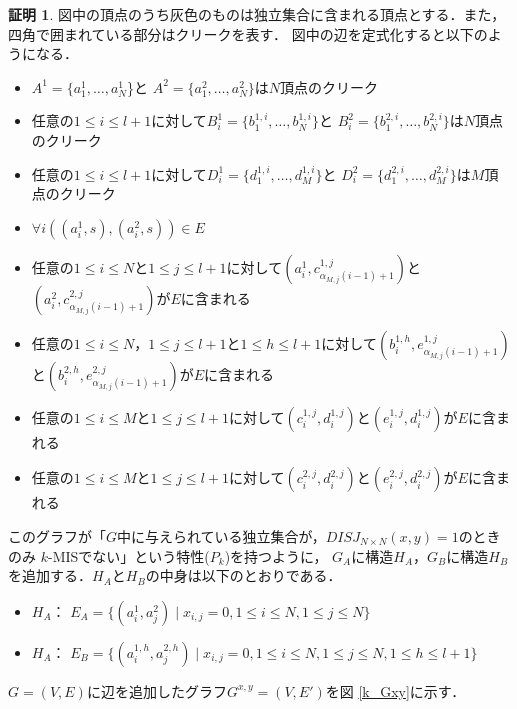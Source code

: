 \documentclass[12pt]{thesis}
\theoremstyle{definition}
\newtheorem*{prf*}{証明}
\begin{document}
\begin{prf*}
図中の頂点のうち灰色のものは独立集合に含まれる頂点とする．また，四角で囲まれている部分はクリークを表す．
図中の辺を定式化すると以下のようになる．
\begin{itemize}
\item $A^{1}=\{a^{1}_{1},\dots,a^{1}_{N}$\}と
$A^{2}=\{a^{2}_{1},\dots,a^{2}_{N}\}$は$N$頂点のクリーク
\item 任意の$1\leq i \leq l+1$に対して$B^{1}_{i}=\{b^{1,i}_{1},\dots,b^{1,i}_{N}\}$と
$B^{2}_{i}=\{b^{2,i}_{1},\dots,b^{2,i}_{N}\}$は$N$頂点のクリーク
\item 任意の$1\leq i \leq l+1$に対して$D^{1}_{i}=\{d^{1,i}_{1},\dots,d^{1,i}_{M}\}$と
$D^{2}_{i}=\{d^{2,i}_{1},\dots,d^{2,i}_{M}\}$は$M$頂点のクリーク
\item $\forall i((a_{i}^{1}, s), (a_{i}^{2}, s)) \in E$
\item 任意の$1\leq i \leq N$と$1\leq j \leq l+1$に対して$\left(a^{1}_{i},c^{1,j}_{\alpha_{M,j}(i-1)+1}\right)$と$\left(a^{2}_{i},c^{2,j}_{\alpha_{M,j}(i-1)+1}\right)$が$E$に含まれる
\item 任意の$1\leq i \leq N$，$1\leq j \leq l+1$と$1\leq h \leq l+1$に対して$\left(b^{1,h}_{i},e^{1,j}_{\alpha_{M,j}(i-1)+1}\right)$と$\left(b^{2,h}_{i},e^{2,j}_{\alpha_{M,j}(i-1)+1}\right)$が$E$に含まれる
\item 任意の$1\leq i \leq M$と$1\leq j \leq l+1$に対して$(c_{i}^{1, j}, d_{i}^{1, j})$と$(e_{i}^{1, j}, d_{i}^{1, j})$が$E$に含まれる
\item 任意の$1\leq i \leq M$と$1\leq j \leq l+1$に対して$(c_{i}^{2, j}, d_{i}^{2, j})$と$(e_{i}^{2, j}, d_{i}^{2, j})$が$E$に含まれる
\end{itemize}

このグラフが「$G$中に与えられている独立集合が，$DISJ_{N \times N} (x, y) = 1$のときのみ
$k$-MISでない」という特性($P_{k}$)を持つように，
$G_{A}$に構造$H_{A}$，$G_{B}$に構造$H_{B}$を追加する．$H_{A}$と$H_{B}$の中身は以下のとおりである．

\begin{itemize}
\item $H_{A}$： $E_{A}=\{(a^{1}_{i},a^{2}_{j}) \mid x_{i,j}=0, 1 \leq i \leq N, 1 \leq j \leq N\}$
\item $H_{A}$： $E_{B}=\{(a^{1,h}_{i},a^{2,h}_{j}) \mid x_{i,j}=0, 1 \leq i \leq N, 1 \leq j \leq N, 1 \leq h \leq l+1\}$
\end{itemize}

$G = (V, E)$に辺を追加したグラフ$G^{x, y} = (V, E')$を図 \ref{k_Gxy}に示す．


\end{prf*}
\end{document}

